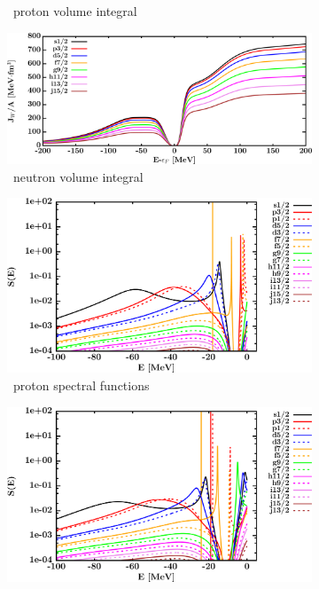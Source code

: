 \begin{figure}[hbtp]
\begin{subfigure}[b]{0.45\textwidth}
        \caption{\niEight\ proton volume integral}
        \label{DOMFitData_ni58_proton_potentialIntegral}
    \end{subfigure}\hspace{6pt}
    \begin{subfigure}[b]{0.45\textwidth}
        \centering
        \includegraphics[width=\linewidth]{figures/ni58_neutronVolumeIntegrals.png}
        \caption{\niEight\ neutron volume integral}
        \label{DOMFitData_ni58_neutron_potentialIntegral}
    \end{subfigure}\vspace{0.3in}
    \begin{subfigure}[b]{0.45\textwidth}
        \centering
        \includegraphics[width=\linewidth]{figures/ni58_protonSpectralFunctions.png}
        \caption{\niEight\ proton spectral functions}
        \label{DOMFitData_ni58_proton_spectralFunctions}
    \end{subfigure}\hspace{6pt}
    \begin{subfigure}[b]{0.45\textwidth}
        \centering
        \includegraphics[width=\linewidth]{figures/ni58_neutronSpectralFunctions.png}

\end{subfigure}
\end{figure}
